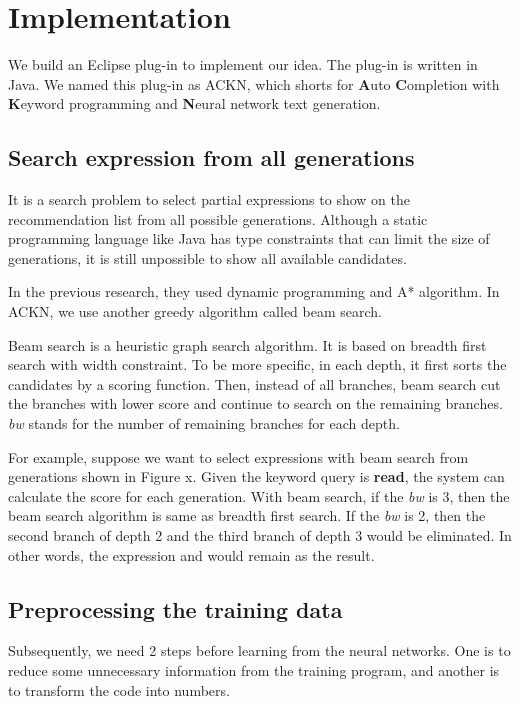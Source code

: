 \documentclass[PRO,english]{ipsj}
\begin{document}
\section{Implementation}

We build an Eclipse plug-in to implement our idea. The plug-in is written in Java. We named this plug-in as ACKN, which shorts for \textbf{A}uto \textbf{C}ompletion with \textbf{K}eyword programming and \textbf{N}eural network text generation.

\subsection{Search expression from all generations}
It is a search problem to select partial expressions to show on the recommendation list from all possible generations. Although a static programming language like Java has type constraints that can limit the size of generations, it is still unpossible to show all available candidates.

In the previous research, they used dynamic programming and A* algorithm. In ACKN, we use another greedy algorithm called beam search.

Beam search is a heuristic graph search algorithm. It is based on breadth first search with width constraint. To be more specific, in each depth, it first sorts the candidates by a scoring function. Then, instead of all branches, beam search cut the branches with lower score and continue to search on the remaining branches. \textit{bw} stands for the number of remaining branches for each depth.

For example, suppose we want to select expressions with beam search from generations shown in Figure x. Given the keyword query is \textbf{read}, the system can calculate the score for each generation. With beam search, if the \textit{bw} is 3, then the beam search algorithm is same as breadth first search. If the \textit{bw} is 2, then the second branch of depth 2 and the third branch of depth 3 would be eliminated. In other words, the expression \texttt{} and \textt{} would remain as the result.

\subsection{Preprocessing the training data}
\label{subsection:Preprocessing}
Subsequently, we need 2 steps before learning from the neural networks. One is to reduce some unnecessary information from the training program, and another is to transform the code into numbers.
\end{document}
